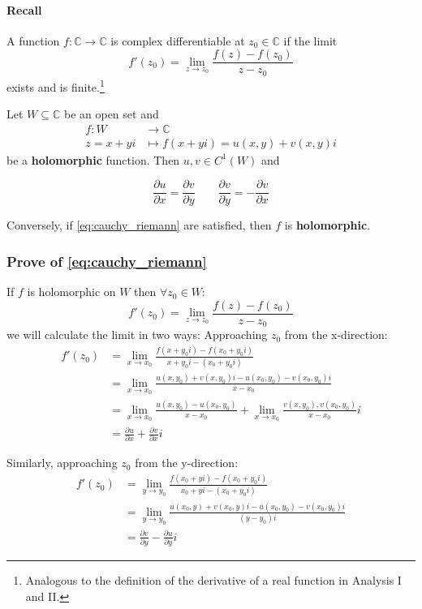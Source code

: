 \paragraph{Recall} A function $f:\mathbb C \to \mathbb C$ is complex differentiable at $z_0\in\mathbb C$ if the limit $$f'(z_0)=\lim_{z\to z_0} \frac{f(z)-f(z_0)}{z-z_0}$$ exists and is finite.\footnote{Analogous to the definition of the derivative of a real function in Analysis I and II.}

Let $W\subseteq \mathbb C$ be an open set and 
\begin{equation*}
	\begin{split}
	f:W&\to\mathbb{C}\\
	z=x+yi&\mapsto f(x+yi)=u(x,y)+v(x,y)i
	\end{split}
\end{equation*}
be a \textbf{holomorphic} function. Then $u,v\in C^1(W)$ and

\begin{equation}
	\label{eq:cauchy_riemann}
	\frac{\partial u}{\partial x}=\frac{\partial v}{\partial y}\qquad 
	\frac{\partial v}{\partial y}=-\frac{\partial v}{\partial x}	
\end{equation}

Conversely, if \eqref{eq:cauchy_riemann} are satisfied, then $f$ is \textbf{holomorphic}.

\subsubsection{Prove of \eqref{eq:cauchy_riemann}}
If $f$ is holomorphic on $W$ then $\forall z_0\in W$:
$$
f'(z_0)=\lim_{z\to z_0} \frac{f(z)-f(z_0)}{z-z_0}
$$
we will calculate the limit in two ways:
Approaching $z_0$ from the x-direction:
\begin{equation*}
\begin{split}
	f'(z_0) &= \lim_{x\to x_0} \frac{f(x+y_0i)-f(x_0+y_0i)}{x+y_0i-(x_0+y_0i)}\\
	&= \lim_{x\to x_0} \frac{u(x,y_0)+v(x,y_0)i-u(x_0,y_0)-v(x_0,y_0)i}{x-x_0}\\
	&= \lim_{x\to x_0} \frac{u(x,y_0)-u(x_0,y_0)}{x-x_0} + \lim_{x\to x_0} \frac{v(x,y_0),v(x_0,y_0)}{x-x_0}i\\
	&= \frac{\partial u}{\partial x} + \frac{\partial v}{\partial x}i
\end{split}
\end{equation*}

Similarly, approaching $z_0$ from the y-direction:
\begin{equation*}
	\begin{split}
		f'(z_0) &= \lim_{y\to y_0} \frac{f(x_0+yi)-f(x_0+y_0i)}{x_0+yi-(x_0+y_0i)}\\
		&= \lim_{y\to y_0} \frac{u(x_0,y)+v(x_0,y)i-u(x_0,y_0)-v(x_0,y_0)i}{(y-y_0)i}\\
		&= \frac{\partial v}{\partial y} - \frac{\partial u}{\partial y}i
	\end{split}
\end{equation*}

